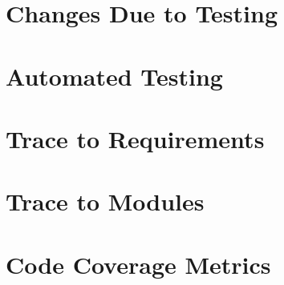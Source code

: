 \documentclass[12pt, titlepage]{article}
\begin{document}
\section{Changes Due to Testing}

\section{Automated Testing}
		
\section{Trace to Requirements}
		
\section{Trace to Modules}		

\section{Code Coverage Metrics}
\end{document}
